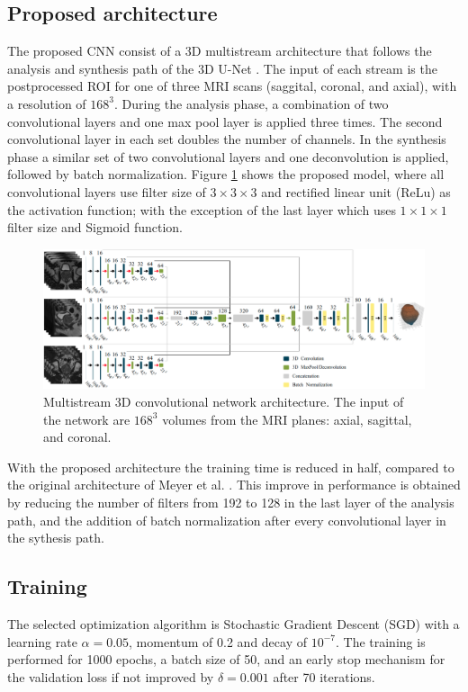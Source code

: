 \subsection{Proposed architecture}
The proposed CNN consist of a 3D multistream architecture that follows the analysis
and synthesis path of the 3D U-Net \cite{cciccek20163d}. The input of each stream is
the postprocessed ROI for one of three MRI scans (saggital, coronal, and axial), 
with a resolution of $168^3$. During the analysis phase, a combination
of two convolutional layers and one max pool layer is applied three times. The second 
convolutional layer in each set doubles the number of channels. 
In the synthesis phase a similar set of two convolutional layers and
one deconvolution is applied, followed by batch normalization.
Figure \ref{fig:nn} shows the proposed model, where 
all convolutional layers use filter size of $3 \times 3 \times 3$ and
rectified linear unit (ReLu) as the activation function; with the exception
of the last layer which uses  $1 \times 1 \times 1$ filter size and Sigmoid function. 
\begin{figure}[h]
    \centering
    \includegraphics[totalheight=.3\textheight]{imgs/methodology/NN.png}
    \caption{Multistream 3D convolutional network architecture. The input of the network
    are $168^3$ volumes from the MRI planes: axial, sagittal, and coronal. }
    \label{fig:nn}
\end{figure}

With the proposed architecture the training time is reduced in half, compared
to the original architecture of Meyer et al. \cite{anneke}. This
improve in performance is obtained by  reducing the number of filters 
from 192 to 128 in the last layer of the analysis path, and
the addition of batch normalization after every convolutional layer 
in the sythesis path.

\subsection{Training}
\label{subsec:training}
The selected optimization algorithm is Stochastic Gradient Descent (SGD) with a
learning rate $\alpha = 0.05$, momentum of 0.2 and decay of $10^{-7}$. The training is performed
for 1000 epochs, a batch size of 50, and an early stop mechanism for the validation
loss if not improved by $\delta = 0.001$ after 70 iterations. 

